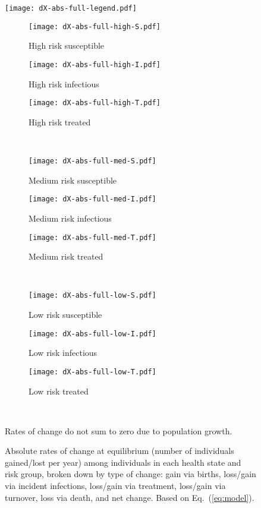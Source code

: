 \begin{figure}[H]
  \begingroup\centering
  \texttt{[image: dX-abs-full-legend.pdf]}
  \begin{subfigure}{0.33\linewidth}
    \texttt{[image: dX-abs-full-high-S.pdf]}
    \caption{High risk susceptible}\label{fig:dX-app-high-S}
  \end{subfigure}%
  \begin{subfigure}{0.33\linewidth}
    \texttt{[image: dX-abs-full-high-I.pdf]}
    \caption{High risk infectious}\label{fig:dX-app-high-I}
  \end{subfigure}%
  \begin{subfigure}{0.33\linewidth}
    \texttt{[image: dX-abs-full-high-T.pdf]}
    \caption{High risk treated}\label{fig:dX-app-high-T}
  \end{subfigure}\\
  \begin{subfigure}{0.33\linewidth}
    \texttt{[image: dX-abs-full-med-S.pdf]}
    \caption{Medium risk susceptible}\label{fig:dX-app-med-S}
  \end{subfigure}%
  \begin{subfigure}{0.33\linewidth}
    \texttt{[image: dX-abs-full-med-I.pdf]}
    \caption{Medium risk infectious}\label{fig:dX-app-med-I}
  \end{subfigure}%
  \begin{subfigure}{0.33\linewidth}
    \texttt{[image: dX-abs-full-med-T.pdf]}
    \caption{Medium risk treated}\label{fig:dX-app-med-T}
  \end{subfigure}\\
  \begin{subfigure}{0.33\linewidth}
    \texttt{[image: dX-abs-full-low-S.pdf]}
    \caption{Low risk susceptible}\label{fig:dX-app-low-S}
  \end{subfigure}%
  \begin{subfigure}{0.33\linewidth}
    \texttt{[image: dX-abs-full-low-I.pdf]}
    \caption{Low risk infectious}\label{fig:dX-app-low-I}
  \end{subfigure}%
  \begin{subfigure}{0.33\linewidth}
    \texttt{[image: dX-abs-full-low-T.pdf]}
    \caption{Low risk treated}\label{fig:dX-app-low-T}
  \end{subfigure}\\
  \endgroup
  \caption{Absolute rates of change at equilibrium
    (number of individuals gained/lost per year)
    among individuals in each health state and risk group,
    broken down by type of change:
    gain via births,
    loss/gain via incident infections,
    loss/gain via treatment,
    loss/gain via turnover,
    loss via death,
    and net change.
    Based on Eq.~(\ref{eq:model}).}
  \label{fig:dX-app}
  \footnotesize
  Rates of change do not sum to zero due to population growth.
\end{figure}
